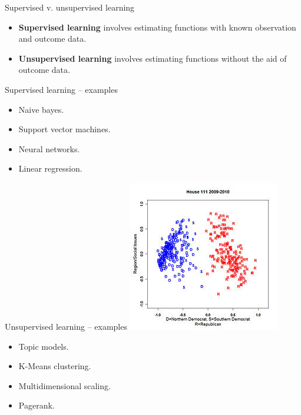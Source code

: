 \documentclass{beamer}
\begin{document}
\begin{frame}{Supervised v. unsupervised learning } %
	\begin{itemize}
		\item \textbf{Supervised learning} involves estimating functions with known observation and outcome data.
		\item \textbf{Unsupervised learning} involves estimating functions without the aid of outcome data. 
	\end{itemize}

\end{frame}


\begin{frame}{Supervised learning -- examples } %
	\begin{itemize}
		\item Naive bayes.
		\item Support vector machines.
		\item Neural networks.
		\item Linear regression.
	\end{itemize}
\end{frame}

\begin{frame}{Unsupervised learning -- examples } %
\centering
\includegraphics[scale=.5]{nominate}
	\begin{itemize}
		\item Topic models.
		\item K-Means clustering.
		\item Multidimensional scaling.
		\item Pagerank.
	\end{itemize}
\end{frame}
\end{document}
